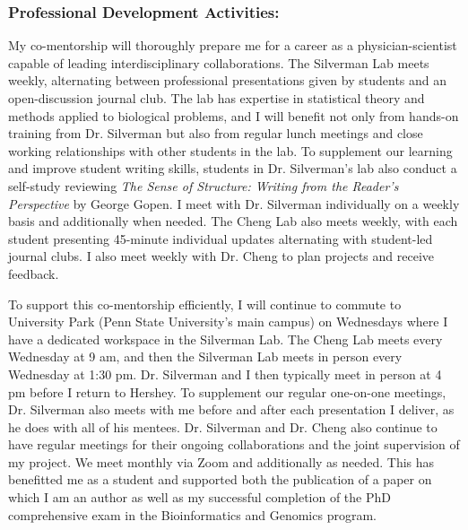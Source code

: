 \documentclass{NIHGrant}
\begin{document}
\subsubsection*{Professional Development Activities:}
My co-mentorship will thoroughly prepare me for a career as a physician-scientist capable of leading interdisciplinary collaborations. The Silverman Lab meets weekly, alternating between professional presentations given by students and an open-discussion journal club. The lab has expertise in statistical theory and methods applied to biological problems, and I will benefit not only from hands-on training from Dr. Silverman but also from regular lunch meetings and close working relationships with other students in the lab. To supplement our learning and improve student writing skills, students in Dr. Silverman's lab also conduct a self-study reviewing \textit{The Sense of Structure: Writing from the Reader's Perspective} by George Gopen. I meet with Dr. Silverman individually on a weekly basis and additionally when needed. The Cheng Lab also meets weekly, with each student presenting 45-minute individual updates alternating with student-led journal clubs. I also meet weekly with Dr. Cheng to plan projects and receive feedback.

To support this co-mentorship efficiently, I will continue to commute to University Park (Penn State University's main campus) on Wednesdays where I have a dedicated workspace in the Silverman Lab. The Cheng Lab meets every Wednesday at 9 am, and then the Silverman Lab meets in person every Wednesday at 1:30 pm. Dr. Silverman and I then typically meet in person at 4 pm before I return to Hershey. To supplement our regular one-on-one meetings, Dr. Silverman also meets with me before and after each presentation I deliver, as he does with all of his mentees. Dr. Silverman and Dr. Cheng also continue to have regular meetings for their ongoing collaborations and the joint supervision of my project. We meet monthly via Zoom and additionally as needed. This has benefitted me as a student and supported both the publication of a paper on which I am an author as well as my successful completion of the PhD comprehensive exam in the Bioinformatics and Genomics program. %
\end{document}

